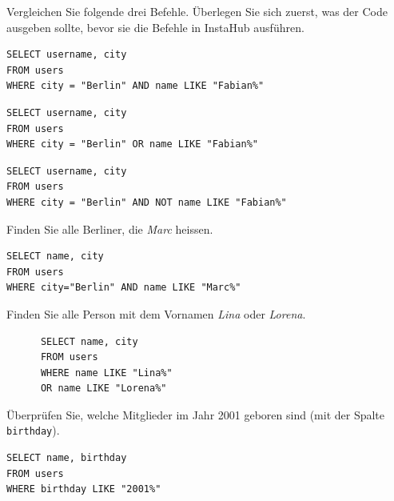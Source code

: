 \begin{myexercise}
  Vergleichen Sie folgende drei Befehle. Überlegen Sie sich zuerst, was der Code ausgeben sollte, bevor sie die Befehle in InstaHub ausführen.

  \begin{lstlisting}
SELECT username, city 
FROM users 
WHERE city = "Berlin" AND name LIKE "Fabian%"
\end{lstlisting}

  \begin{lstlisting}
SELECT username, city 
FROM users 
WHERE city = "Berlin" OR name LIKE "Fabian%"
\end{lstlisting}

  \begin{lstlisting}
SELECT username, city 
FROM users 
WHERE city = "Berlin" AND NOT name LIKE "Fabian%"
\end{lstlisting}
\end{myexercise}

\begin{myexercise}
  Finden Sie alle Berliner, die \textit{Marc} heissen.
  \begin{myanswer}
    \begin{lstlisting}
SELECT name, city
FROM users
WHERE city="Berlin" AND name LIKE "Marc%"
\end{lstlisting}
  \end{myanswer}
\end{myexercise}

\begin{myexercise}
  Finden Sie alle Person mit dem Vornamen \textit{Lina} oder \textit{Lorena}.
  \begin{myanswer}
    \begin{lstlisting}
      SELECT name, city
      FROM users
      WHERE name LIKE "Lina%"
      OR name LIKE "Lorena%"
    \end{lstlisting}
  \end{myanswer}
\end{myexercise}

\begin{mychallenge}
  Überprüfen Sie, welche Mitglieder im Jahr 2001 geboren sind (mit der Spalte \texttt{birthday}).
  \begin{myanswer}
    \begin{lstlisting}
SELECT name, birthday
FROM users
WHERE birthday LIKE "2001%"
\end{lstlisting}
  \end{myanswer}
\end{mychallenge}


